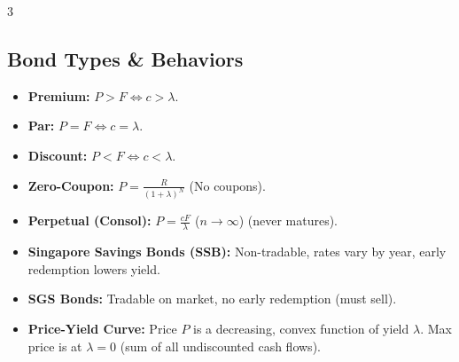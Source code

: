 \documentclass[8pt,a4paper,landscape]{extarticle}
\begin{document}
\begin{multicols*}{3}
    \subsection{Bond Types \& Behaviors}
    \begin{itemize}
        \item \textbf{Premium:} $P > F \iff c > \lambda$.
        \item \textbf{Par:} $P = F \iff c = \lambda$.
        \item \textbf{Discount:} $P < F \iff c < \lambda$.
        \item \textbf{Zero-Coupon:} $P = \frac{R}{(1+\lambda)^{N}}$ (No coupons).
        \item \textbf{Perpetual (Consol):} $P = \frac{cF}{\lambda}$ ($n \to \infty$) (never matures).
        \item \textbf{Singapore Savings Bonds (SSB):} Non-tradable, rates vary by year, early redemption lowers yield.
        \item \textbf{SGS Bonds:} Tradable on market, no early redemption (must sell).
        \item \textbf{Price-Yield Curve:} Price $P$ is a decreasing, convex function of yield $\lambda$. Max price is at $\lambda=0$ (sum of all undiscounted cash flows).
    \end{itemize}


\end{multicols*}
\end{document}
